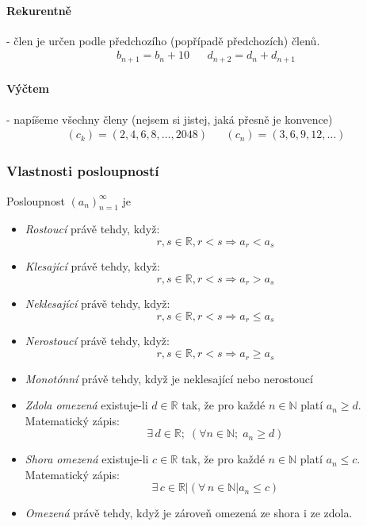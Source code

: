 \documentclass[12pt]{article}
\begin{document}
\paragraph{Rekurentně} - člen je určen podle předchozího (popřípadě předchozích) členů.
\begin{align}
b_{n+1} = b_n + 10 && d_{n+2} = d_{n} + d_{n+1}
\end{align}
\paragraph{Výčtem} - napíšeme všechny členy (nejsem si jistej, jaká přesně je konvence)
\begin{align}
 (c_k) = \left( 2,4,6,8, \dotsc, 2048\right) && (c_n) = \left( 3,6,9,12, \dotsc \right)
\end{align}
\subsubsection{Vlastnosti posloupností}
Posloupnost $\left( a_n \right)_{n=1}^{\infty}$ je
\begin{itemize}
\item \emph{Rostoucí} právě tehdy, když:
\begin{equation}
r,s \in \mathbb{R}, r<s \Rightarrow a_r < a_s
\end{equation}
\item \emph{Klesající} právě tehdy, když:
\begin{equation}
r,s \in \mathbb{R}, r<s \Rightarrow a_r > a_s
\end{equation}
\item \emph{Neklesající} právě tehdy, když:
\begin{equation}
r,s \in \mathbb{R}, r<s \Rightarrow a_r \leq a_s
\end{equation}
\item \emph{Nerostoucí} právě tehdy, když:
\begin{equation}
r,s \in \mathbb{R}, r<s \Rightarrow a_r \geq a_s
\end{equation}
\item \emph{Monotónní} právě tehdy, když je neklesající nebo nerostoucí
\item \emph{Zdola omezená} existuje-li $d \in \mathbb{R}$ tak, že pro každé $ n \in \mathbb{N}$ platí $a_n \geq d$. Matematický zápis:
\begin{equation}
\exists \, d \in \mathbb{R}; \; \left( \forall n \in \mathbb{N}; \; a_n \geq d \right)
\end{equation}
\item \emph{Shora omezená} existuje-li $c \in \mathbb{R}$ tak, že pro každé $ n \in \mathbb{N}$ platí $a_n \leq c$. Matematický zápis:
\begin{equation}
\exists \, c \in \mathbb{R} | \left( \forall \, n \in \mathbb{N} | a_n \leq c \right)
\end{equation}
\item \emph{Omezená} právě tehdy, když je zároveň omezená ze shora i ze zdola.
\end{itemize}
\end{document}
